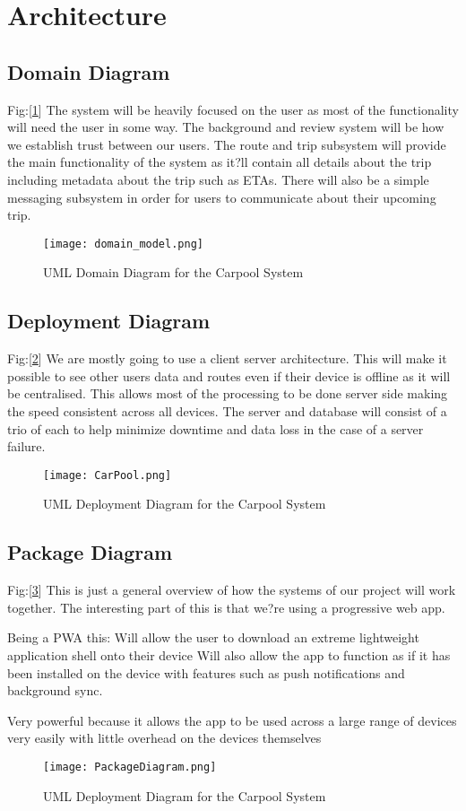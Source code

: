 \documentclass[a4paper]{article}
\begin{document}
\section{Architecture}
\subsection{Domain Diagram}
Fig:[\ref{fig:1}] The system will be heavily focused on the user as most of the functionality will need the user in some way.
The background and review system will be how we establish trust between our users.
The route and trip subsystem will provide the main functionality of the system as it?ll contain all details about the trip including metadata about the trip such as ETAs.
There will also be a simple messaging subsystem in order for users to communicate about their upcoming trip.

\begin{figure}[h!]
     \centering
     \texttt{[image: domain\_model.png]}
     \caption{UML Domain Diagram for the Carpool System}
     \label{fig:1}
\end{figure}

\subsection{Deployment Diagram}
Fig:[\ref{fig:2}] We are mostly going to use a client server architecture.
This will make it possible to see other users data and routes even if their device is offline as it will be centralised.
This allows most of the processing to be done server side making the speed consistent across all devices. \newline
The server and database will consist of a trio of each to help minimize downtime and data loss in the case of a server failure.

\begin{figure}[!ht]
     \centering
     \texttt{[image: CarPool.png]}
     \caption{UML Deployment Diagram for the Carpool System}
     \label{fig:2}
\end{figure}

\subsection{Package Diagram}
Fig:[\ref{fig:3}] This is just a general overview of how the systems of our project will work together. The interesting part of this is that we?re using a progressive web app.

Being a PWA this:
Will allow the user to download an extreme lightweight application shell onto their device
Will also allow the app to function as if it has been installed on the device with features such as push notifications and background sync.

Very powerful because it allows the app to be used across a large range of devices very easily with little overhead on the devices themselves


\begin{figure}[!ht]
     \centering
     \texttt{[image: PackageDiagram.png]}
     \caption{UML Deployment Diagram for the Carpool System}
     \label{fig:3}
\end{figure}
\end{document}
